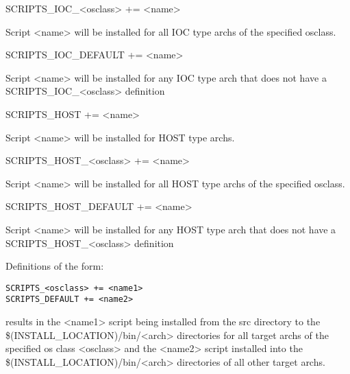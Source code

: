 \begin{description}\item SCRIPTS\_IOC\_\textless{}osclass\textgreater{} += \textless{}name\textgreater{}

\end{description}Script \textless{}name\textgreater{} will be installed for all IOC type archs of the specified osclass.

\begin{description}\item SCRIPTS\_IOC\_DEFAULT += \textless{}name\textgreater{}

\end{description}Script \textless{}name\textgreater{} will be installed for any IOC type arch that does not have a SCRIPTS\_IOC\_\textless{}osclass\textgreater{} 
definition

\begin{description}\item {}SCRIPTS\_HOST += \textless{}name\textgreater{}

\end{description}Script \textless{}name\textgreater{} will be installed for HOST type archs.

\begin{description}\item SCRIPTS\_HOST\_\textless{}osclass\textgreater{} += \textless{}name\textgreater{}

\end{description}Script \textless{}name\textgreater{} will be installed for all HOST type archs of the specified osclass.

\begin{description}\item SCRIPTS\_HOST\_DEFAULT += \textless{}name\textgreater{}

\end{description}Script \textless{}name\textgreater{} will be installed for any HOST type arch that does not have a SCRIPTS\_HOST\_\textless{}osclass\textgreater{} 
definition

Definitions of the form:

\begin{verbatim}SCRIPTS_<osclass> += <name1>
SCRIPTS_DEFAULT += <name2>
\end{verbatim}results in the \textless{}name1\textgreater{} script being installed from the src directory to the \$(INSTALL\_LOCATION)/bin/\textless{}arch\textgreater{} 
directories for all target archs of the specified os class \textless{}osclass\textgreater{} and the \textless{}name2\textgreater{} script installed into the 
\$(INSTALL\_LOCATION)/bin/\textless{}arch\textgreater{} directories of all other target archs.

